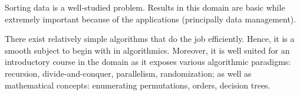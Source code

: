 \label{tree:sorting:intro}

Sorting data is a well-studied problem. Results in this domain are basic while
extremely important because of the applications (principally data management).

There exist relatively simple algorithms that do the job efficiently. Hence, it
is a smooth subject to begin with in algorithmics. Moreover, it is well
suited for an introductory course in the domain as it exposes various
algorithmic paradigms: recursion, divide-and-conquer, parallelism,
randomization; as well as mathematical concepts: enumerating permutations,
orders, decision trees.
